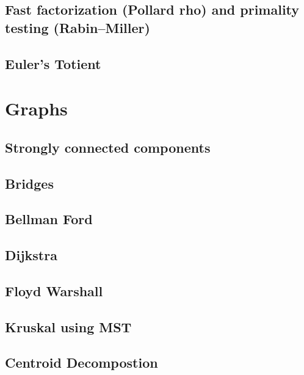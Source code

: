 \documentclass[12pt]{extarticle}
\begin{document}
\begin{multicols*}{3}
\subsection{Fast factorization (Pollard rho) and primality testing
(Rabin--Miller)} %


\subsection{Euler's Totient} %


\section{Graphs}

\subsection{Strongly connected components} %


\subsection{Bridges} %


\subsection{Bellman Ford}


\subsection{Dijkstra}


\subsection{Floyd Warshall}


\subsection{Kruskal using MST}


\subsection{Centroid Decompostion}



\end{multicols*}
\end{document}
